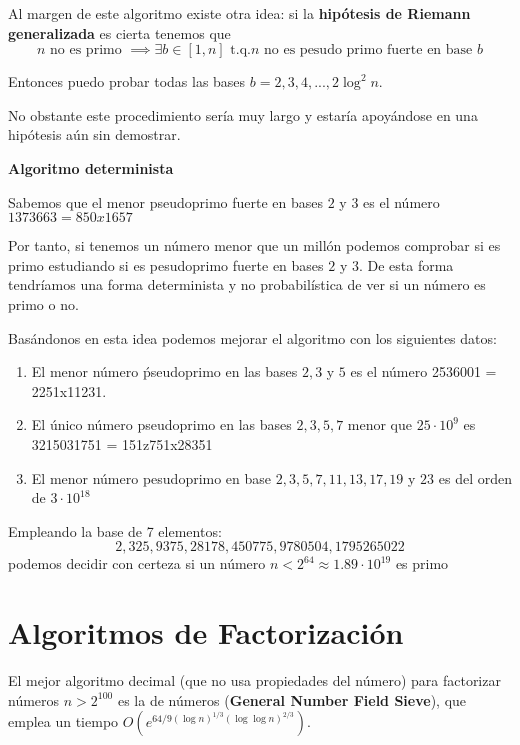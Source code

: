 Al margen de este algoritmo existe otra idea: si la \textbf{hipótesis de Riemann generalizada} es cierta tenemos que
\[n \text{ no es primo } \implies \exists b \in [1,n] \text{ t.q.} n \text{ no es pesudo primo fuerte en base } b\]

Entonces puedo probar todas las bases $b=2,3,4,...,2\log^2 n$.

No obstante este procedimiento sería muy largo y estaría apoyándose en una hipótesis aún sin demostrar.

\begin{example}\textbf{Algoritmo determinista}

Sabemos que el menor pseudoprimo fuerte en bases $2$ y $3$ es el número $1373663 = 850x1657$

Por tanto, si tenemos un número menor que un millón podemos comprobar si es primo estudiando si es pesudoprimo fuerte en bases $2$ y $3$. De esta forma tendríamos una forma determinista y no probabilística de ver si un número es primo o no.

Basándonos en esta idea podemos mejorar el algoritmo con los siguientes datos:
\begin{enumerate}
\item El menor número ṕseudoprimo en las bases $2,3$ y $5$ es el número 2536001 = 2251x11231.

\item El único número pseudoprimo en las bases $2,3,5,7$ menor que $25 \cdot 10^9$ es 3215031751 = 151z751x28351

\item El menor número pesudoprimo en base $2,3,5,7,11,13,17,19$ y $23$ es del orden de $3 \cdot 10^{18}$

\end{enumerate}
\end{example}

\begin{theorem}
Empleando la base de 7 elementos:
\[2,325,9375,28178,450775,9780504,1795265022\]
podemos decidir con certeza si un número $n<2^{64}\approx 1.89\cdot 10^{19}$ es primo
\end{theorem}

\section{Algoritmos de Factorización}
El mejor algoritmo decimal (que no usa propiedades del número) para factorizar números $n>2^{100}$ es la  de números (\textbf{General Number Field Sieve}), que emplea un tiempo $O\left(e^{64/9 (\log n)^{1/3}(\log\log n)^{2/3}} \right)$.

